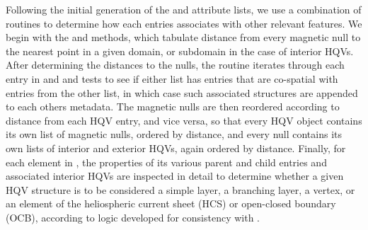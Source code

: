 \documentclass[10pt]{aastex62}
\begin{document}
\begin{itemize}
Following the initial generation of the  and  attribute lists, we use a combination of routines to determine how each entries associates with other relevant features.
We begin with the  and  methods, which tabulate distance from every magnetic null to the nearest point in a given domain, or subdomain in the case of interior HQVs. 
After determining the distances to the nulls, the  routine iterates through each entry in  and  and tests to see if either list has entries that are co-spatial with entries from the other list, in which case such associated structures are appended to each others metadata. 
The magnetic nulls are then reordered according to distance from each HQV entry, and vice versa, so that every HQV object contains its own list of magnetic nulls, ordered by distance, and every null contains its own lists of interior and exterior HQVs, again ordered by distance. 
Finally, for each element in , the properties of its various parent and child entries and associated interior HQVs are inspected in detail to determine whether a given HQV structure is to be considered a simple layer, a branching layer, a vertex, or an element of the heliospheric current sheet (HCS) or open-closed boundary (OCB), according to logic developed for consistency with \cite{Scott:2018a}.


\end{itemize}
\end{document}
